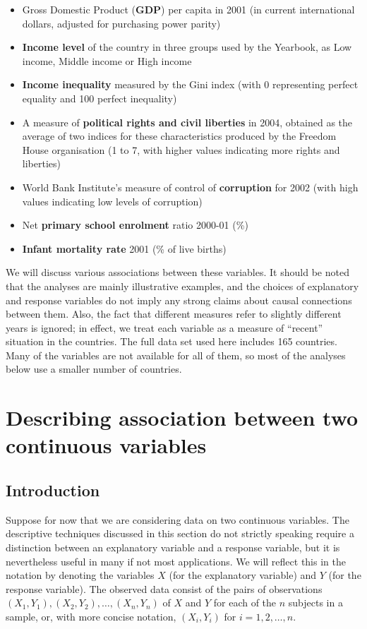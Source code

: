 \documentclass[11pt,a4paper,openany]{book}
\begin{document}
\begin{itemize}
\item
  Gross Domestic Product (\textbf{GDP}) per capita in 2001 (in current
  international dollars, adjusted for purchasing power parity)
\item
  \textbf{Income level} of the country in three groups used by the
  Yearbook, as Low income, Middle income or High income
\item
  \textbf{Income inequality} measured by the Gini index (with 0
  representing perfect equality and 100 perfect inequality)
\item
  A measure of \textbf{political rights and civil liberties} in 2004,
  obtained as the average of two indices for these characteristics
  produced by the Freedom House organisation (1 to 7, with higher values
  indicating more rights and liberties)
\item
  World Bank Institute's measure of control of \textbf{corruption} for
  2002 (with high values indicating low levels of corruption)
\item
  Net \textbf{primary school enrolment} ratio 2000-01 (\%)
\item
  \textbf{Infant mortality rate} 2001 (\% of live births)
\end{itemize}

We will discuss various associations between these variables. It should
be noted that the analyses are mainly illustrative examples, and the
choices of explanatory and response variables do not imply any strong
claims about causal connections between them. Also, the fact that
different measures refer to slightly different years is ignored; in
effect, we treat each variable as a measure of ``recent'' situation in
the countries. The full data set used here includes 165 countries. Many
of the variables are not available for all of them, so most of the
analyses below use a smaller number of countries.

\section{Describing association between two continuous
variables}\label{s-regression-descr}

\subsection{Introduction}\label{ss-regression-descr-intro}

Suppose for now that we are considering data on two continuous
variables. The descriptive techniques discussed in this section do not
strictly speaking require a distinction between an explanatory variable
and a response variable, but it is nevertheless useful in many if not
most applications. We will reflect this in the notation by denoting the
variables \(X\) (for the explanatory variable) and \(Y\) (for the
response variable). The observed data consist of the pairs of
observations \((X_{1}, Y_{1}), (X_{2}, Y_{2}), \dots, (X_{n}, Y_{n})\)
of \(X\) and \(Y\) for each of the \(n\) subjects in a sample, or, with
more concise notation, \((X_{i}, Y_{i})\) for \(i=1,2,\dots,n\).
\end{document}
